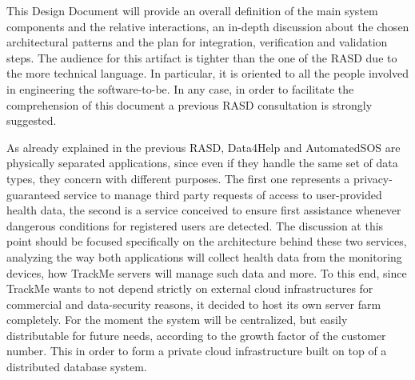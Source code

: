 


{}
{\setlength{\parskip}{0.5cm}
\raggedright

This Design Document will provide an overall definition of the main system components and the relative interactions, an in-depth discussion about the chosen architectural patterns and the plan for integration, verification and validation steps. The audience for this artifact is tighter than the one of the RASD due to the more technical language. In particular, it is oriented to all the people involved in engineering the software-to-be. In any case, in order to facilitate the comprehension of this document a previous RASD consultation is strongly suggested.

{}

As already explained in the previous RASD, Data4Help and AutomatedSOS are physically separated applications, since even if they handle the same set of data types, they concern with different purposes. The first one represents a privacy-guaranteed service to manage third party requests of access to user-provided health data, the second is a service conceived to ensure first assistance whenever dangerous conditions for registered users are detected. The discussion at this point should be focused specifically on the architecture behind these two services, analyzing the way both applications will collect health data from the monitoring devices, how TrackMe servers will manage such data and more. To this end, since TrackMe wants to not depend strictly on external cloud infrastructures for commercial and data-security reasons, it decided to host  its own server farm completely. For the moment the system will be centralized, but easily distributable for future needs, according to the growth factor of the customer number. This in order to form a private cloud infrastructure built on top of a distributed database system.



}
